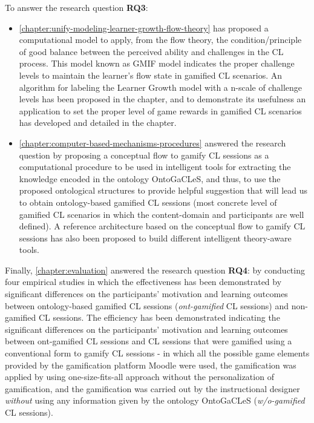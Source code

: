 To answer the research question \textbf{RQ3}:  

\begin{itemize}
\item
\autoref{chapter:unify-modeling-learner-growth-flow-theory} has proposed a computational model to apply, from the flow theory, the condition/principle of good balance between the perceived ability and challenges in the CL process.
This model known as GMIF model indicates the proper challenge levels to maintain the learner's flow state in gamified CL scenarios.
An algorithm for labeling the Learner Growth model with a n-scale of challenge levels has been proposed in the chapter, and to demonstrate its usefulness an application to set the proper level of game rewards in gamified CL scenarios has developed and detailed in the chapter.

\item
\autoref{chapter:computer-based-mechanisms-procedures} answered the research question by proposing a conceptual flow to gamify CL sessions as a computational procedure to be used in intelligent tools for extracting the knowledge encoded in the ontology OntoGaCLeS, and thus, to use the proposed ontological structures to provide helpful suggestion that will lead us to obtain ontology-based gamified CL sessions (most concrete level of gamified CL scenarios in which the content-domain and participants are well defined).
A reference architecture based on the conceptual flow to gamify CL sessions has also been proposed to build different intelligent theory-aware tools.
\end{itemize}


Finally, \autoref{chapter:evaluation} answered the research question \textbf{RQ4}:
by conducting four empirical studies in which the effectiveness has been demonstrated by significant differences on the participants' motivation and learning outcomes between ontology-based gamified CL sessions (\emph{ont-gamified} CL sessions) and non-gamified CL sessions.
The efficiency has been demonstrated indicating the significant differences on the participants' motivation and learning outcomes between ont-gamified CL sessions and CL sessions that were gamified using a conventional form to gamify CL sessions - in which all the possible game elements provided by the gamification platform Moodle were used, the gamification was applied by using  one-size-fits-all approach without the personalization of gamification, and the gamification was carried out by the instructional designer \emph{without} using any information given by the ontology OntoGaCLeS (\emph{w/o-gamified} CL sessions).

